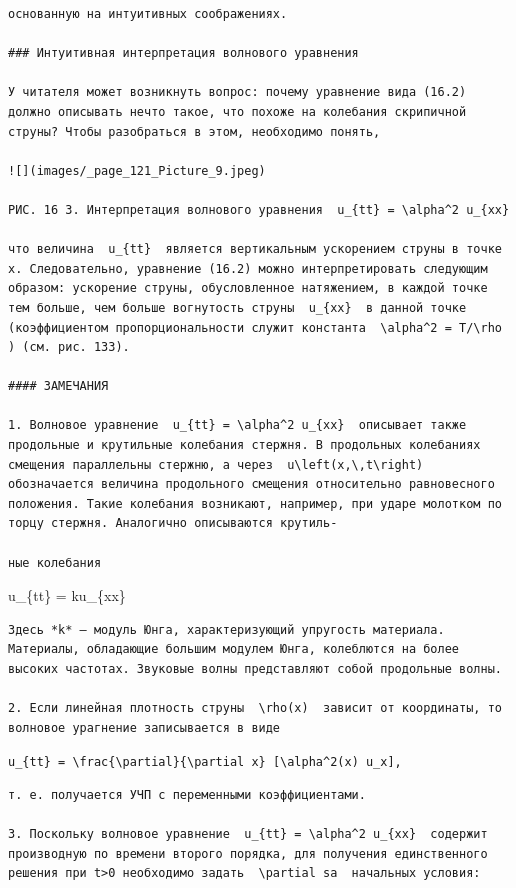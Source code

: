 \documentclass[
  ukrainian,
]{article}
\begin{document}
\begin{verbatim}
основанную на интуитивных соображениях.

### Интуитивная интерпретация волнового уравнения

У читателя может возникнуть вопрос: почему уравнение вида (16.2) должно описывать нечто такое, что похоже на колебания скрипичной струны? Чтобы разобраться в этом, необходимо понять,

![](images/_page_121_Picture_9.jpeg)

РИС. 16 3. Интерпретация волнового уравнения  u_{tt} = \alpha^2 u_{xx} 

что величина  u_{tt}  является вертикальным ускорением струны в точке x. Следовательно, уравнение (16.2) можно интерпретировать следующим образом: ускорение струны, обусловленное натяжением, в каждой точке тем больше, чем больше вогнутость струны  u_{xx}  в данной точке (коэффициентом пропорциональности служит константа  \alpha^2 = T/\rho ) (см. рис. 133).

#### ЗАМЕЧАНИЯ

1. Волновое уравнение  u_{tt} = \alpha^2 u_{xx}  описывает также продольные и крутильные колебания стержня. В продольных колебаниях смещения параллельны стержню, а через  u\left(x,\,t\right)  обозначается величина продольного смещения относительно равновесного положения. Такие колебания возникают, например, при ударе молотком по торцу стержня. Аналогично описываются крутиль-

ные колебания
\end{verbatim}

u\_\{tt\} = ku\_\{xx\}

\begin{verbatim}
Здесь *k* — модуль Юнга, характеризующий упругость материала. Материалы, обладающие большим модулем Юнга, колеблются на более высоких частотах. Звуковые волны представляют собой продольные волны.

2. Если линейная плотность струны  \rho(x)  зависит от координаты, то волновое урагнение записывается в виде
\end{verbatim}

\texttt{u\_\{tt\}\ =\ \textbackslash{}frac\{\textbackslash{}partial\}\{\textbackslash{}partial\ x\}\ {[}\textbackslash{}alpha\^{}2(x)\ u\_x{]},}

\begin{verbatim}
т. е. получается УЧП с переменными коэффициентами.

3. Поскольку волновое уравнение  u_{tt} = \alpha^2 u_{xx}  содержит производную по времени второго порядка, для получения единственного решения при t>0 необходимо задать  \partial sa  начальных условия:
\end{verbatim}
\end{document}
